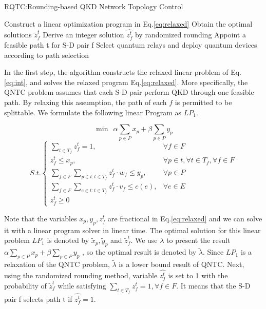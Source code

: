 \begin{algorithm}[h]\label{RQTC}
\caption{RQTC:Rounding-based QKD Network Topology Control}
\begin{algorithmic}[1]
\STATE  Construct a linear optimization program in Eq.\ref{eq:relaxed}
\STATE Obtain the optimal solutions $\widetilde{z}_f^t$
\STATE Derive an integer solution $\hat{z_f^t}$ by randomized rounding
\STATE Appoint a feasible path t for S-D pair f
\ENDIF
\ENDFOR
\ENDFOR
\STATE Select quantum relays and deploy quantum devices according to path selection
\end{algorithmic}
\end{algorithm}

In the first step, the algorithm constructs the relaxed linear problem of Eq.\ref{eq:int}, and solves the relaxed program Eq.\ref{eq:relaxed}. More specifically, the QNTC problem assumes that each S-D pair perform QKD through one feasible path. By relaxing this assumption, the path of each $f$ is permitted to be splittable. We formulate the following linear Program as $LP_1$.

{\small
	\begin{equation*}
	\min \ \  \alpha\sum_{p \in P}{x_p} + \beta\sum_{p \in P}{y_p}
	\end{equation*}
	\begin{equation}\label{eq:relaxed}
	{S.t.}\begin{cases}
     \sum_{t \in T_f}{z_f^t} = 1, & \forall f \in F \\
     z_f^t \le x_p, & \forall p \in t, \forall t \in T_f, \forall f \in F \\
     \sum_{f \in F}\sum_{p \in t:t \in T_f}{z_f^t \cdot w_f} \le  y_p, & \forall p \in P \\
     \sum_{f \in F}\sum_{e \in t:t \in T_f}{z_f^t \cdot v_f} \le c(e), & \forall e \in E \\
     z_f^t \ge 0
	\end{cases}
	\end{equation}
}

Note that the variables $x_p, y_p, z_f^t$ are fractional in Eq.\ref{eq:relaxed} and we can solve it with a linear program solver in linear time. The optimal solution for this linear problem $LP_1$ is denoted by $\widetilde{x}_p,\widetilde{y}_p$ and $\widetilde{z}_f^t$. We use $\lambda$ to present the result $\alpha\sum_{p \in P}{x_p} + \beta\sum_{p \in P}{y_p}$ , so the optimal result is denoted by $\widetilde{\lambda}$. Since $LP_1$ is a relaxation of the QNTC problem, $\widetilde{\lambda}$ is a lower bound result of QNTC. Next, using the randomized rounding method, variable $\hat{z_f^t}$ is set to 1 with the probability of $\widetilde{z}_f^t$ while satisfying $\sum_{t \in T_f}{z_f^t} = 1, \forall f \in F$. It means that the S-D pair f selects path t if $\hat{z_f^t} = 1$.

